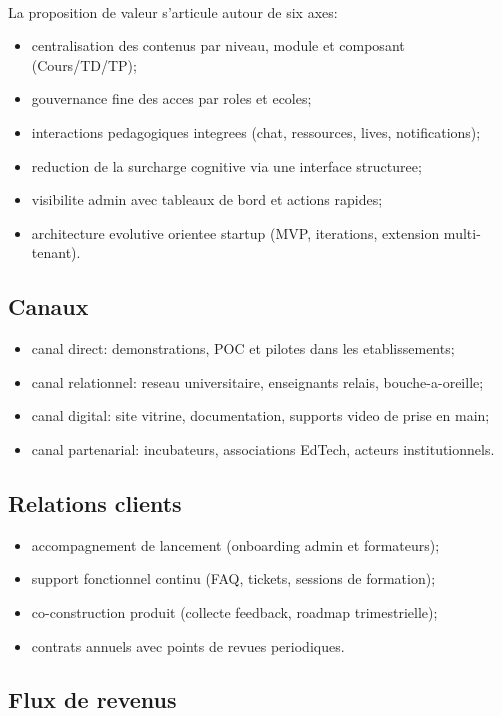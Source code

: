 ﻿﻿\documentclass[12pt,a4paper,oneside]{report}
\begin{document}
La proposition de valeur s'articule autour de six axes:
\begin{itemize}
  \item centralisation des contenus par niveau, module et composant (Cours/TD/TP);
  \item gouvernance fine des acces par roles et ecoles;
  \item interactions pedagogiques integrees (chat, ressources, lives, notifications);
  \item reduction de la surcharge cognitive via une interface structuree;
  \item visibilite admin avec tableaux de bord et actions rapides;
  \item architecture evolutive orientee startup (MVP, iterations, extension multi-tenant).
\end{itemize}

\subsection{Canaux}

\begin{itemize}
  \item canal direct: demonstrations, POC et pilotes dans les etablissements;
  \item canal relationnel: reseau universitaire, enseignants relais, bouche-a-oreille;
  \item canal digital: site vitrine, documentation, supports video de prise en main;
  \item canal partenarial: incubateurs, associations EdTech, acteurs institutionnels.
\end{itemize}

\subsection{Relations clients}

\begin{itemize}
  \item accompagnement de lancement (onboarding admin et formateurs);
  \item support fonctionnel continu (FAQ, tickets, sessions de formation);
  \item co-construction produit (collecte feedback, roadmap trimestrielle);
  \item contrats annuels avec points de revues periodiques.
\end{itemize}

\subsection{Flux de revenus}
\end{document}
